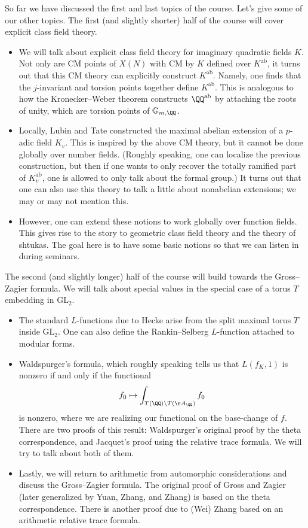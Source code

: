\documentclass[../notes.tex]{subfiles}
\begin{document}
So far we have discussed the first and last topics of the course. Let's give some of our other topics. The first (and slightly shorter) half of the course will cover explicit class field theory.
\begin{itemize}
	\item We will talk about explicit class field theory for imaginary quadratic fields $K$. Not only are CM points of $X(N)$ with CM by $K$ defined over $K^{\mathrm{ab}}$, it turns out that this CM theory can explicitly construct $K^{\mathrm{ab}}$. Namely, one finds that the $j$-invariant and torsion points together define $K^{\mathrm{ab}}$. This is analogous to how the Kronecker--Weber theorem constructs $\QQ^{\mathrm{ab}}$ by attaching the roots of unity, which are torsion points of $\mathbb G_{m,\QQ}$.
	\item Locally, Lubin and Tate constructed the maximal abelian extension of a $p$-adic field $K_v$. This is inspired by the above CM theory, but it cannot be done globally over number fields. (Roughly speaking, one can localize the previous construction, but then if one wants to only recover the totally ramified part of $K_v^{\mathrm{ab}}$, one is allowed to only talk about the formal group.) It turns out that one can also use this theory to talk a little about nonabelian extensions; we may or may not mention this.
	\item However, one can extend these notions to work globally over function fields. This gives rise to the story to geometric class field theory and the theory of shtukas. The goal here is to have some basic notions so that we can listen in during seminars.
\end{itemize}
The second (and slightly longer) half of the course will build towards the Gross--Zagier formula. We will talk about special values in the special case of a torus $T$ embedding in $\mathrm{GL}_2$.
\begin{itemize}
	\item The standard $L$-functions due to Hecke arise from the split maximal torus $T$ inside $\mathrm{GL}_2$. One can also define the Rankin--Selberg $L$-function attached to modular forms.
	\item Waldspurger's formula, which roughly speaking tells us that $L(f_K,1)$ is nonzero if and only if the functional
	\[f_0\mapsto\int_{T(\QQ)\backslash T(\AA_\QQ)}f_0\]
	is nonzero, where we are realizing our functional on the base-change of $f$. There are two proofs of this result: Waldspurger's original proof by the theta correspondence, and Jacquet's proof using the relative trace formula. We will try to talk about both of them.
	\item Lastly, we will return to arithmetic from automorphic considerations and discuss the Gross--Zagier formula. The original proof of Gross and Zagier (later generalized by Yuan, Zhang, and Zhang) is based on the theta correspondence. There is another proof due to (Wei) Zhang based on an arithmetic relative trace formula.
\end{itemize}
\end{document}
